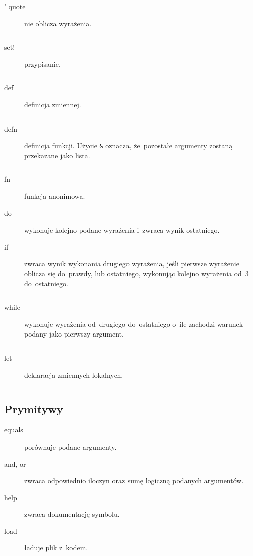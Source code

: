 \documentclass[a4paper,11pt]{article}
\newcommand{\clj}[1]{\inputminted[fontsize=\footnotesize]{clojure}{code/#1.clj}}
\begin{document}
\begin{description}
\item[' quote] nie oblicza wyrażenia.
  \clj{quote}

%
%

\item[set!] przypisanie.
  \clj{set!}

\item[def] definicja zmiennej.
  \clj{def}

\item[defn] definicja funkcji. Użycie \verb+&+ oznacza, że~pozostałe argumenty
  zostaną przekazane jako lista.
  \clj{defn}

\item[fn] funkcja anonimowa.

\item[do] wykonuje kolejno podane wyrażenia i~zwraca wynik ostatniego.

\item[if] zwraca wynik wykonania drugiego wyrażenia, jeśli pierwsze wyrażenie
  oblicza się do~prawdy, lub ostatniego, wykonując kolejno wyrażenia od~3
  do~ostatniego.
  \clj{if}

\item[while] wykonuje wyrażenia od~drugiego do~ostatniego o~ile zachodzi
  warunek podany jako pierwszy argument.
  \clj{while}

\item[let] deklaracja zmiennych lokalnych.
  \clj{let}
\end{description}

\subsection{Prymitywy}

\begin{description}
\item[equals] porównuje podane argumenty.

\item[and, or] zwraca odpowiednio iloczyn oraz sumę logiczną podanych
  argumentów.

\item[help] zwraca dokumentację symbolu.

\item[load] ładuje plik z~kodem.
\end{description}
\end{document}
